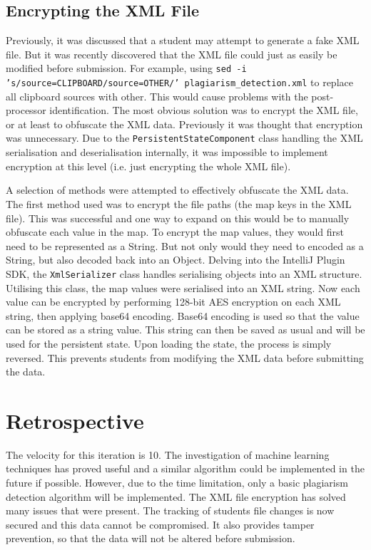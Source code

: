 \subsection{Encrypting the XML File}
Previously, it was discussed that a student may attempt to generate a fake XML file. But it was recently discovered that the XML file could just as easily be modified before submission. For example, using \texttt{sed -i 's/source=CLIPBOARD/source=OTHER/' plagiarism\_detection.xml} to replace all clipboard sources with other. This would cause problems with the post-processor identification. The most obvious solution was to encrypt the XML file, or at least to obfuscate the XML data. Previously it was thought that encryption was unnecessary. Due to the \texttt{PersistentStateComponent} class handling the XML serialisation and deserialisation internally, it was impossible to implement encryption at this level (i.e. just encrypting the whole XML file).

A selection of methods were attempted to effectively obfuscate the XML data. The first method used was to encrypt the file paths (the map keys in the XML file). This was successful and one way to expand on this would be to manually obfuscate each value in the map. To encrypt the map values, they would first need to be represented as a String. But not only would they need to encoded as a String, but also decoded back into an Object. Delving into the IntelliJ Plugin SDK, the \texttt{XmlSerializer} class handles serialising objects into an XML structure. Utilising this class, the map values were serialised into an XML string. Now each value can be encrypted by performing 128-bit AES encryption on each XML string, then applying base64 encoding. Base64 encoding is used so that the value can be stored as a string value. This string can then be saved as usual and will be used for the persistent state. Upon loading the state, the process is simply reversed. This prevents students from modifying the XML data before submitting the data.

\section{Retrospective}
The velocity for this iteration is 10. The investigation of machine learning techniques has proved useful and a similar algorithm could be implemented in the future if possible. However, due to the time limitation, only a basic plagiarism detection algorithm will be implemented. The XML file encryption has solved many issues that were present. The tracking of students file changes is now secured and this data cannot be compromised. It also provides tamper prevention, so that the data will not be altered before submission.
